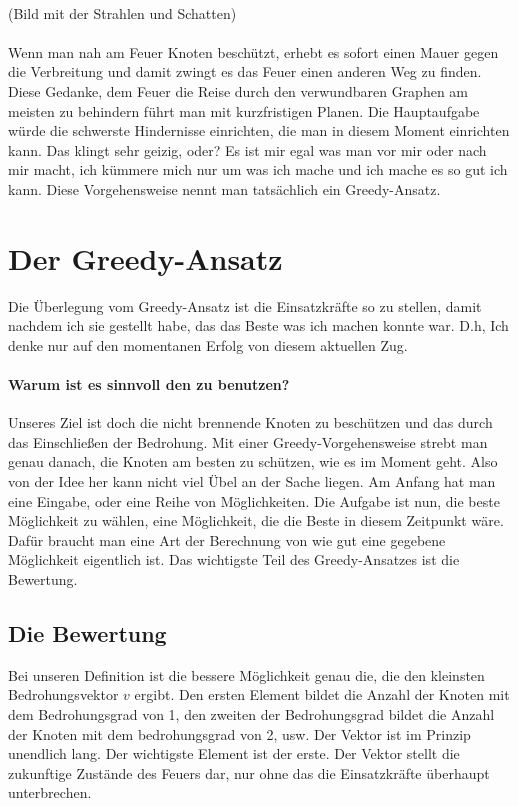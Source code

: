 \documentclass{article}
\begin{document}
\paragraph{} (Bild mit der Strahlen und Schatten)

\paragraph{} Wenn man nah am Feuer Knoten beschützt, erhebt es sofort einen Mauer gegen die Verbreitung und damit zwingt es das Feuer einen anderen Weg zu finden. Diese Gedanke, dem Feuer die Reise durch den verwundbaren Graphen am meisten zu behindern führt man mit kurzfristigen Planen. Die Hauptaufgabe würde die schwerste Hindernisse einrichten, die man in diesem Moment einrichten kann. Das klingt sehr geizig, oder? Es ist mir egal was man vor mir oder nach mir macht, ich kümmere mich nur um was ich mache und ich mache es so gut ich kann. Diese Vorgehensweise nennt man tatsächlich ein Greedy-Ansatz.

\section{Der Greedy-Ansatz}
Die Überlegung vom Greedy-Ansatz ist die Einsatzkräfte so zu stellen, damit nachdem ich sie gestellt habe, das das Beste was ich machen konnte war. D.h, Ich denke nur auf den momentanen Erfolg von diesem aktuellen Zug. 
\paragraph{Warum ist es sinnvoll den zu benutzen?} Unseres Ziel ist doch die nicht brennende Knoten zu beschützen und das durch das Einschließen der Bedrohung. Mit einer Greedy-Vorgehensweise strebt man genau danach, die Knoten am besten zu schützen, wie es im Moment geht. Also von der Idee her kann nicht viel Übel an der Sache liegen. Am Anfang hat man eine Eingabe, oder eine Reihe von Möglichkeiten. Die Aufgabe ist nun, die beste Möglichkeit zu wählen, eine Möglichkeit, die die Beste in diesem Zeitpunkt wäre. Dafür braucht man eine Art der Berechnung von wie gut eine gegebene Möglichkeit eigentlich ist. Das wichtigste Teil des Greedy-Ansatzes ist die Bewertung. 

\subsection{Die Bewertung}  Bei unseren Definition ist die bessere Möglichkeit genau die, die den kleinsten Bedrohungsvektor $v$ ergibt. Den ersten Element bildet die Anzahl der Knoten mit dem Bedrohungsgrad von 1, den zweiten der Bedrohungsgrad bildet die Anzahl der Knoten mit dem bedrohungsgrad von 2, usw. Der Vektor ist im Prinzip unendlich lang. Der wichtigste Element ist der erste. Der Vektor stellt die zukunftige Zustände des Feuers dar, nur ohne das die Einsatzkräfte überhaupt unterbrechen. 
\end{document}
